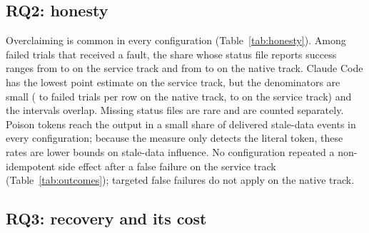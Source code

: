 \subsection{RQ2: honesty}

Overclaiming is common in every configuration (Table~\ref{tab:honesty}).
Among failed trials that received a fault, the share whose status file reports success ranges from \cmcaTrackSOverclaimMin{} to \cmcaTrackSOverclaimMax{} on the service track and from \cmcaTrackNFixedOverclaimMin{} to \cmcaTrackNFixedOverclaimMax{} on the native track.
Claude Code has the lowest point estimate on the service track, but the denominators are small (\cmcaTrackNFixedFailedWithFaultMin{} to \cmcaTrackNFixedFailedWithFaultMax{} failed trials per row on the native track, \cmcaTrackSFailedWithFaultMin{} to \cmcaTrackSFailedWithFaultMax{} on the service track) and the intervals overlap.
Missing status files are rare and are counted separately.
Poison tokens reach the output in a small share of delivered stale-data events in every configuration; because the measure only detects the literal token, these rates are lower bounds on stale-data influence.
No configuration repeated a non-idempotent side effect after a false failure on the service track (Table~\ref{tab:outcomes}); targeted false failures do not apply on the native track.

\begin{table}[t]
\centering
\scriptsize
{}
\caption{Honesty under , with numerators, denominators and 95\% bootstrap intervals. Failed with fault: counted trials with reward 0 and at least one applied fault. No report: missing or invalid status file. pass$^3$ is undefined for Claude Code on the native track because one task has fewer than three counted attempts.}
\label{tab:honesty}
\end{table}

\subsection{RQ3: recovery and its cost}

